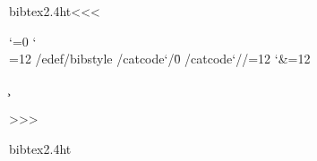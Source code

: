\documentclass{article}
\begin{document}
\newcount\tmpcnt  \tmpcnt\time  \divide{}
\edef\temp{\the\tmpcnt}
\multiply{} \advance\tmpcnt  \time

\edef\version{\the\year-\ifnum \month<10 0\fi
  \the\month-\ifnum \day<10 0\fi\the\day
   -\ifnum \temp<10 0\fi \temp
   :\ifnum \tmpcnt<10 0\fi\the\tmpcnt}

\def\CopyYear.#1.{%
   \ifnum #1=\year #1\space\space\space\space\space\space
    \else          #1--\the\year\fi
}





\<bibtex2.4ht\><<<

\catcode`\/=0
\catcode`\\=12
/edef/bibstyle{\bibstyle}
/catcode`/\=0
/catcode`//=12
\catcode`\&=12

\def\get{%
  \immediate\read15 to \line
  \ifeof15 \else
     \expandafter\scan\line @@@@@@@@@&&&&
     \expandafter\get
  \fi
}
\def\scan#1#2#3#4#5#6#7#8#9{\def\first{#1#2#3#4#5#6#7#8#9}\put}
\def\put#1&&&&{%
    \immediate\write15{\ifx \first\bibstyle 
           \ifx \style\empty \line \else \bibstyle{\style}\fi
        \else  \line\fi}}
\newcount\c
\def\Cats#1#2#3{\edef\temp{\the\c}%
  \c=#3
  \def\next{\catcode\c=#1
    \ifnum \c=#2 \let\next=\relax \fi
    \advance\c by  -1 \next}\next
  \c=\temp  }

\def\jaux#1#2{%
  \bgroup
    \def\style{#2}%
    \immediate\openin15=#1.aux
    \ifeof15 \else
      \Cats{12}{0}{255}%
      \Cats{11}{65}{90}%
      \Cats{11}{97}{122}%
      \catcode`\^^M=5
      \immediate\openout15=#1j.aux
      \get
      \immediate\write15{}
      \closeout15
    \fi
  \egroup
}


>>>



  \OutputCodE\<bibtex2.4ht\>
\end{document}
